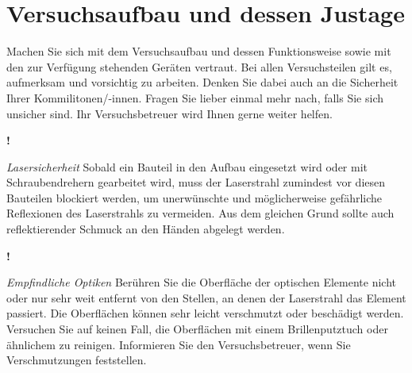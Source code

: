 
\section{Versuchsaufbau und dessen Justage}

Machen Sie sich mit dem Versuchsaufbau und dessen Funktionsweise sowie mit den zur Verfügung stehenden Geräten vertraut. Bei allen Versuchsteilen gilt es, aufmerksam und vorsichtig zu arbeiten. Denken Sie dabei auch an die Sicherheit Ihrer Kommilitonen/-innen. Fragen Sie lieber einmal mehr nach, falls Sie sich unsicher sind. Ihr Versuchsbetreuer wird Ihnen gerne weiter helfen. 

\begin{marginfigure}[10mm]{\Huge \textbf{!}}\end{marginfigure}%
\emph{Lasersicherheit} Sobald ein Bauteil in den Aufbau eingesetzt wird oder mit Schraubendrehern gearbeitet wird, muss der Laserstrahl zumindest vor diesen Bauteilen blockiert werden, um unerwünschte und möglicherweise gefährliche Reflexionen des Laserstrahls zu vermeiden.  Aus dem gleichen Grund sollte auch reflektierender Schmuck an den Händen abgelegt werden.

\begin{marginfigure}[10mm]{\Huge \textbf{!}}\end{marginfigure}%
\emph{Empfindliche Optiken} Berühren Sie die Oberfläche der optischen Elemente nicht oder nur sehr weit entfernt von den Stellen, an denen der Laserstrahl das Element passiert. Die Oberflächen können sehr leicht verschmutzt oder beschädigt werden. Versuchen Sie auf keinen Fall, die Oberflächen mit einem Brillenputztuch oder ähnlichem zu reinigen. Informieren Sie den Versuchsbetreuer, wenn Sie Verschmutzungen feststellen.  

